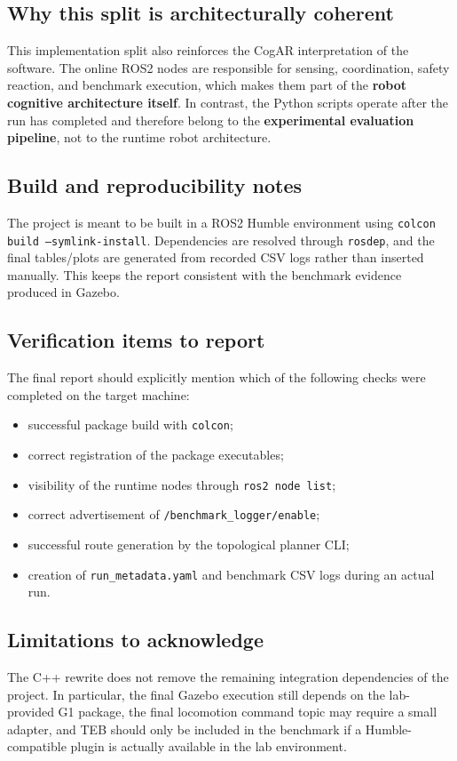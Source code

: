 \subsection{Why this split is architecturally coherent}

This implementation split also reinforces the CogAR interpretation of the software. The online ROS2 nodes are
responsible for sensing, coordination, safety reaction, and benchmark execution, which makes them part of the
\textbf{robot cognitive architecture itself}. In contrast, the Python scripts operate after the run has completed and
therefore belong to the \textbf{experimental evaluation pipeline}, not to the runtime robot architecture.

\subsection{Build and reproducibility notes}

The project is meant to be built in a ROS2 Humble environment using \texttt{colcon build --symlink-install}. Dependencies
are resolved through \texttt{rosdep}, and the final tables/plots are generated from recorded CSV logs rather than inserted
manually. This keeps the report consistent with the benchmark evidence produced in Gazebo.

\subsection{Verification items to report}

The final report should explicitly mention which of the following checks were completed on the target machine:
\begin{itemize}
  \item successful package build with \texttt{colcon};
  \item correct registration of the package executables;
  \item visibility of the runtime nodes through \texttt{ros2 node list};
  \item correct advertisement of \texttt{/benchmark\_logger/enable};
  \item successful route generation by the topological planner CLI;
  \item creation of \texttt{run\_metadata.yaml} and benchmark CSV logs during an actual run.
\end{itemize}

\subsection{Limitations to acknowledge}

The C++ rewrite does not remove the remaining integration dependencies of the project. In particular, the final
Gazebo execution still depends on the lab-provided G1 package, the final locomotion command topic may require a
small adapter, and TEB should only be included in the benchmark if a Humble-compatible plugin is actually available
in the lab environment.
